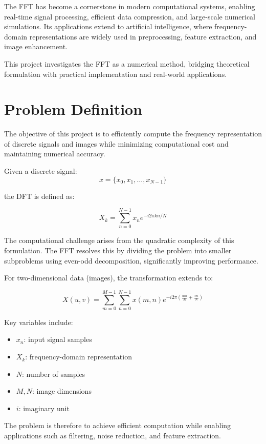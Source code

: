 \documentclass{zc-ust-hw}
\begin{document}
The FFT has become a cornerstone in modern computational systems, enabling real-time signal processing, efficient data compression, and large-scale numerical simulations. Its applications extend to artificial intelligence, where frequency-domain representations are widely used in preprocessing, feature extraction, and image enhancement.

This project investigates the FFT as a numerical method, bridging theoretical formulation with practical implementation and real-world applications.

\section{Problem Definition}
The objective of this project is to efficiently compute the frequency representation of discrete signals and images while minimizing computational cost and maintaining numerical accuracy.

Given a discrete signal:
\[
x = \{x_0, x_1, \dots, x_{N-1}\}
\]

the DFT is defined as:

\begin{equation}
X_k = \sum_{n=0}^{N-1} x_n e^{-i 2\pi kn/N}
\end{equation}

The computational challenge arises from the quadratic complexity of this formulation. The FFT resolves this by dividing the problem into smaller subproblems using even-odd decomposition, significantly improving performance.

For two-dimensional data (images), the transformation extends to:

\begin{equation}
X(u,v) = \sum_{m=0}^{M-1} \sum_{n=0}^{N-1} x(m,n)e^{-i2\pi\left(\frac{um}{M}+\frac{vn}{N}\right)}
\end{equation}

Key variables include:
\begin{itemize}
    \item \(x_n\): input signal samples
    \item \(X_k\): frequency-domain representation
    \item \(N\): number of samples
    \item \(M, N\): image dimensions
    \item \(i\): imaginary unit
\end{itemize}

The problem is therefore to achieve efficient computation while enabling applications such as filtering, noise reduction, and feature extraction.
\end{document}
